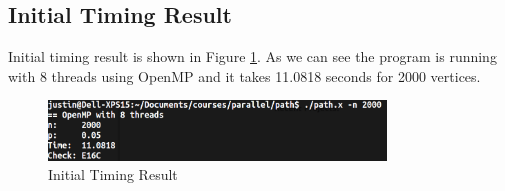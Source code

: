 \subsection{Initial Timing Result}

Initial timing result is shown in Figure \ref{initial_profile_result_2}. As we
can see the program is running with 8 threads using OpenMP and it takes 11.0818
seconds for 2000 vertices.

\begin{figure}[H]
    \centering
    \includegraphics[width=0.8\textwidth]{figs/0_timing.png}
    \caption{Initial Timing Result}
    \label{initial_profile_result_2}
\end{figure}

